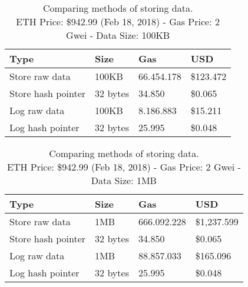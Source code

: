 \begin{table}[!htb]
  \centering
  \begin{tabular}{|l|l|l|l|}
    \hline
    Type & Size & Gas  & USD \\ \hline
    Store raw data & 100KB & 66.454.178  & \$123.472 \\ \hline
    Store hash pointer & 32 bytes & 34.850  & \$0.065 \\ \hline
    Log raw data & 100KB & 8.186.883  & \$15.211 \\ \hline
    Log hash pointer & 32 bytes & 25.995  & \$0.048 \\ \hline
  \end{tabular}
  \captionsetup{format=hang, justification=centering}
  \caption{Comparing methods of storing data.\\ ETH Price: \$942.99 (Feb 18, 2018) - Gas Price: 2 Gwei - Data Size: 100KB}
  \label{table:data_store_comparison_04}
\end{table}

\begin{table}[!htb]
  \centering
  \begin{tabular}{|l|l|l|l|}
    \hline
    Type & Size & Gas  & USD \\ \hline
    Store raw data & 1MB & 666.092.228  & \$1,237.599 \\ \hline
    Store hash pointer & 32 bytes & 34.850  & \$0.065 \\ \hline
    Log raw data & 1MB & 88.857.033  & \$165.096 \\ \hline
    Log hash pointer & 32 bytes & 25.995  & \$0.048 \\ \hline
  \end{tabular}
  \captionsetup{format=hang, justification=centering}
  \caption{Comparing methods of storing data.\\ ETH Price: \$942.99 (Feb 18, 2018) - Gas Price: 2 Gwei - Data Size: 1MB}
  \label{table:data_store_comparison_05}
\end{table}

